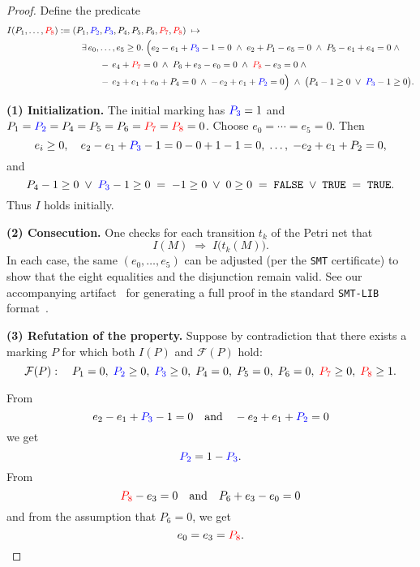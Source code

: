 \begin{proof}
	
	Define the predicate
	\[
	\begin{aligned}
		I(P_{1},\dots,\textcolor{red}{P_{8}})
		:={}&
		(P_{1},\textcolor{blue}{P_{2}},\textcolor{blue}{P_{3}},P_{4},P_{5},P_{6},\textcolor{red}{P_{7}},\textcolor{red}{P_{8}})
		\;\mapsto\;\\
		&\quad
		\exists\,e_{0},\dots,e_{5}\ge0.\;
		\Bigl(
		e_{2}-e_{1}+\textcolor{blue}{P_{3}}-1=0\;\land\;
		e_{2}+P_{1}-e_{5}=0\;\land\;
		P_{5}-e_{1}+e_{4}=0\;\land\\
		&\qquad\quad
		-\,e_{4}+\textcolor{red}{P_{7}}=0\;\land\;
		P_{6}+e_{3}-e_{0}=0\;\land\;
		\textcolor{red}{P_{8}}-e_{3}=0\;\land\\
		&\qquad\quad
		-\,e_{2}+e_{1}+e_{0}+P_{4}=0\;\land\;
		-\,e_{2}+e_{1}+\textcolor{blue}{P_{2}}=0
		\Bigr)
		\;\land\;
		\bigl(P_{4}-1\ge0\;\lor\;\textcolor{blue}{P_{3}}-1\ge0\bigr).
	\end{aligned}
	\]
	
	
	\medskip\noindent
	\textbf{(1) Initialization.}
	The initial marking has $\textcolor{blue}{P_{3}}=1$ and $P_{1}=\textcolor{blue}{P_{2}}=P_{4}=P_{5}=P_{6}=\textcolor{red}{P_{7}}=\textcolor{red}{P_{8}}=0$.
	Choose $e_{0}=\cdots=e_{5}=0$.  Then
	\[
	e_{i}\ge0,\quad
	e_{2}-e_{1}+\textcolor{blue}{P_{3}}-1=0-0+1-1=0,\;\dots,\;-e_{2}+e_{1}+P_{2}=0,
	\]
	and 
	\[
	P_{4}-1\ge0\;\lor\;\textcolor{blue}{P_{3}}-1\ge0
	\;=\;-1\ge0\;\lor\;0\ge0
	\;=\;\texttt{FALSE}\;\lor\;\texttt{TRUE}
	\;=\;\texttt{TRUE}.
	\]
	Thus $I$ holds initially.
	
	\medskip\noindent
	\textbf{(2) Consecution.}
	One checks for each transition $t_{k}$ of the Petri net that
	\[
	I(M)\;\Longrightarrow\;I\bigl(t_{k}(M)\bigr).
	\]
	In each case, the same $(e_{0},\dots,e_{5})$ can be adjusted (per the \texttt{SMT} certificate) to show that the eight equalities and the disjunction remain valid. See our accompanying artifact~\cite{ArtifactRepository} for generating a full proof in the standard \texttt{SMT-LIB} format~\cite{BaStTi10}.
	
	\medskip\noindent
	\textbf{(3) Refutation of the property.}
	Suppose by contradiction that there exists a marking $P$ for which both $I(P)$ and $\mathcal {F}(P)$ hold:
	\[
	\mathcal {F}(P):\quad
	P_{1}=0,\;
	\textcolor{blue}{P_{2}}\ge0,\;
	\textcolor{blue}{P_{3}}\ge0,\;
	P_{4}=0,\;
	P_{5}=0,\;
	P_{6}=0,\;
	\textcolor{red}{P_{7}}\ge0,\;
	\textcolor{red}{P_{8}}\ge1.
	\] 
	
	\noindent
	From
	\[
	e_{2}-e_{1}+\textcolor{blue}{P_{3}}-1=0
	\quad\text{and}\quad
	-e_{2}+e_{1}+\textcolor{blue}{P_{2}}=0
	\]
	we get
	\[
	\textcolor{blue}{P_{2}}=1-\textcolor{blue}{P_{3}}.
	\]
	From
	\[
	\textcolor{red}{P_{8}}-e_{3}=0
	\quad\text{and}\quad
	P_{6}+e_{3}-e_{0}=0
	\]
	and from the assumption that $P_6=0$, we get
	\[
	e_{0}=e_{3}=\textcolor{red}{P_{8}}.
	\]
	

\end{proof}
